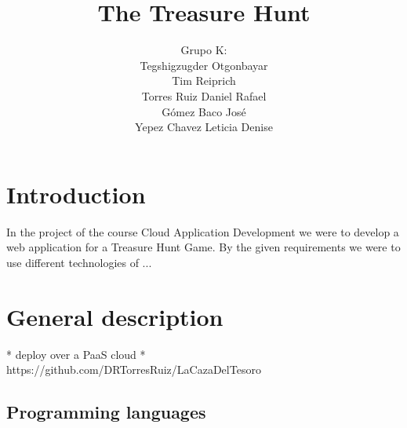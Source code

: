 \documentclass{article}
\title{The Treasure Hunt}
\author{Grupo K: \\
	Tegshigzugder Otgonbayar \\
	Tim Reiprich \\
	Torres Ruiz Daniel Rafael \\
	Gómez Baco José \\
	Yepez Chavez Leticia Denise }
\begin{document}
\pagestyle{plain}

\maketitle



\newpage

\tableofcontents %
\newpage



\section{Introduction}
In the project of the course Cloud Application Development we were to develop a web application for a Treasure Hunt Game. By the given requirements we were to use different technologies of ...

\section{General description}

* deploy over a PaaS cloud
* https://github.com/DRTorresRuiz/LaCazaDelTesoro

\subsection{Programming languages}
\end{document}
